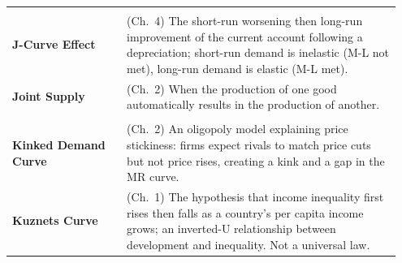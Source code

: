 \documentclass[11pt, a4paper, twoside]{book}
\begin{document}
\begin{longtable}{@{}>{\RaggedRight\arraybackslash}p{0.28\linewidth}>{\RaggedRight\arraybackslash}p{0.67\linewidth}@{}}
\multicolumn{2}{@{}l}{\textbf{\Large\color{CurveNavy} J}} \\[2pt]
\textbf{J-Curve Effect} & (Ch.~4) The short-run worsening then long-run improvement of the current account following a depreciation; short-run demand is inelastic (M-L not met), long-run demand is elastic (M-L met). \\
\textbf{Joint Supply} & (Ch.~2) When the production of one good automatically results in the production of another. \\

\multicolumn{2}{@{}l}{\textbf{\Large\color{CurveNavy} K}} \\[2pt]
\textbf{Kinked Demand Curve} & (Ch.~2) An oligopoly model explaining price stickiness: firms expect rivals to match price cuts but not price rises, creating a kink and a gap in the MR curve. \\
\textbf{Kuznets Curve} & (Ch.~1) The hypothesis that income inequality first rises then falls as a country's per capita income grows; an inverted-U relationship between development and inequality. Not a universal law. \\


\end{longtable}
\end{document}
